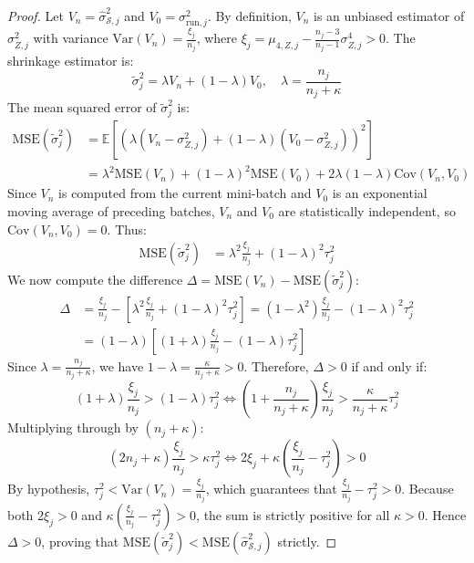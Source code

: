 \documentclass[twocolumn,10pt]{article}
\begin{document}
\begin{proof}
Let $V_n = \hat{\sigma}_{\mathcal{S}, j}^2$ and $V_0 = \sigma_{\mathrm{run}, j}^2$. By definition, $V_n$ is an unbiased estimator of $\sigma_{Z,j}^2$ with variance $\mathrm{Var}(V_n) = \frac{\xi_j}{n_j}$, where $\xi_j = \mu_{4,Z,j} - \frac{n_j-3}{n_j-1}\sigma_{Z,j}^4 > 0$. The shrinkage estimator is:
\begin{equation*}
\tilde{\sigma}_j^2 = \lambda V_n + (1 - \lambda) V_0, \quad \lambda = \frac{n_j}{n_j + \kappa}
\end{equation*}
The mean squared error of $\tilde{\sigma}_j^2$ is:
\begin{align*}
\mathrm{MSE}(\tilde{\sigma}_j^2) &= \mathbb{E}[(\lambda(V_n - \sigma_{Z,j}^2) + (1 - \lambda)(V_0 - \sigma_{Z,j}^2))^2] \\
&= \lambda^2 \mathrm{MSE}(V_n) + (1 - \lambda)^2 \mathrm{MSE}(V_0) + 2\lambda(1 - \lambda)\mathrm{Cov}(V_n, V_0)
\end{align*}
Since $V_n$ is computed from the current mini-batch and $V_0$ is an exponential moving average of preceding batches, $V_n$ and $V_0$ are statistically independent, so $\mathrm{Cov}(V_n, V_0) = 0$. Thus:
\begin{align*}
\mathrm{MSE}(\tilde{\sigma}_j^2) &= \lambda^2 \frac{\xi_j}{n_j} + (1 - \lambda)^2 \tau_j^2
\end{align*}
We now compute the difference $\Delta = \mathrm{MSE}(V_n) - \mathrm{MSE}(\tilde{\sigma}_j^2)$:
\begin{align*}
\Delta &= \frac{\xi_j}{n_j} - \left[ \lambda^2 \frac{\xi_j}{n_j} + (1 - \lambda)^2 \tau_j^2 \right] = (1 - \lambda^2)\frac{\xi_j}{n_j} - (1 - \lambda)^2 \tau_j^2 \\
&= (1 - \lambda) \left[ (1 + \lambda)\frac{\xi_j}{n_j} - (1 - \lambda)\tau_j^2 \right]
\end{align*}
Since $\lambda = \frac{n_j}{n_j + \kappa}$, we have $1 - \lambda = \frac{\kappa}{n_j + \kappa} > 0$. Therefore, $\Delta > 0$ if and only if:
\begin{equation*}
(1 + \lambda)\frac{\xi_j}{n_j} > (1 - \lambda)\tau_j^2 \iff \left(1 + \frac{n_j}{n_j + \kappa}\right)\frac{\xi_j}{n_j} > \frac{\kappa}{n_j + \kappa}\tau_j^2
\end{equation*}
Multiplying through by $(n_j + \kappa)$:
\begin{equation*}
\left(2n_j + \kappa\right)\frac{\xi_j}{n_j} > \kappa \tau_j^2 \iff 2\xi_j + \kappa\left(\frac{\xi_j}{n_j} - \tau_j^2\right) > 0
\end{equation*}
By hypothesis, $\tau_j^2 < \mathrm{Var}(V_n) = \frac{\xi_j}{n_j}$, which guarantees that $\frac{\xi_j}{n_j} - \tau_j^2 > 0$. Because both $2\xi_j > 0$ and $\kappa(\frac{\xi_j}{n_j} - \tau_j^2) > 0$, the sum is strictly positive for all $\kappa > 0$. Hence $\Delta > 0$, proving that $\mathrm{MSE}(\tilde{\sigma}_j^2) < \mathrm{MSE}(\hat{\sigma}_{\mathcal{S}, j}^2)$ strictly.
\end{proof}
\end{document}
